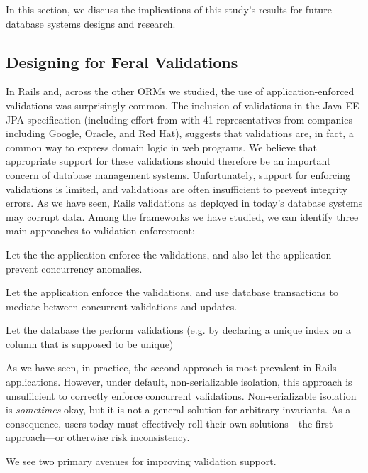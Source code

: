In this section, we discuss the implications of this study's results
for future database systems designs and research.

\subsection{Designing for Feral Validations}

In Rails and, across the other ORMs we studied, the use of
application-enforced validations was surprisingly common. The
inclusion of validations in the Java EE JPA specification (including
effort from with 41 representatives from companies including Google,
Oracle, and Red Hat), suggests that validations are, in fact, a common
way to express domain logic in web programs. We believe that
appropriate support for these validations should therefore be an
important concern of database management systems. Unfortunately,
support for enforcing validations is limited, and validations are
often insufficient to prevent integrity errors. As we have seen, Rails
validations as deployed in today's database systems may corrupt
data. Among the frameworks we have studied, we can identify three main
approaches to validation enforcement:
\begin{defendenumerate}
\item Let the the application enforce the validations, and also let
  the application prevent concurrency anomalies.

\item Let the application enforce the validations, and use database
  transactions to mediate between concurrent validations and updates.

\item Let the database the perform validations (e.g. by declaring a unique
  index on a column that is supposed to be unique)
\end{defendenumerate}
As we have seen, in practice, the second approach is most prevalent in
Rails applications. However, under default, non-serializable
isolation, this approach is unsufficient to correctly enforce
concurrent validations. Non-serializable isolation is
\textit{sometimes} okay, but it is not a general solution for
arbitrary invariants. As a consequence, users today must effectively
roll their own solutions---the first approach---or otherwise risk
inconsistency.

We see two primary avenues for improving validation support.

